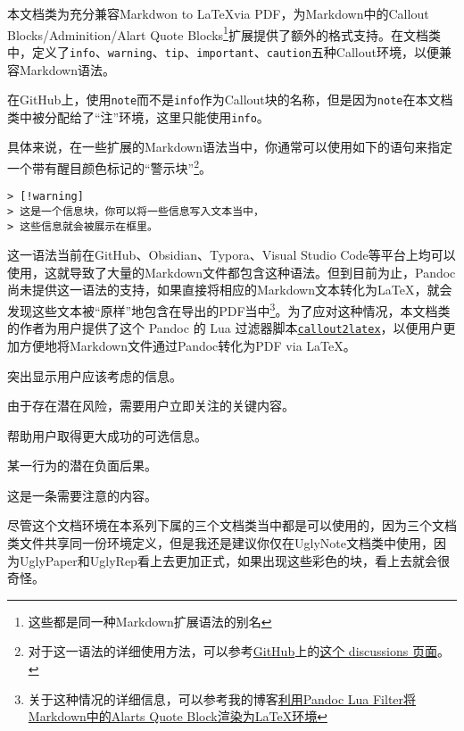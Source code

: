 本文档类为充分兼容Markdwon to \LaTeX via PDF，为Markdown中的Callout Blocks/Adminition/Alart Quote Blocks\footnote{这些都是同一种Markdown扩展语法的别名}扩展提供了额外的格式支持。在文档类中，定义了\texttt{info}、\texttt{warning}、\texttt{tip}、\texttt{important}、\texttt{caution}五种Callout环境，以便兼容Markdown语法。

\begin{note}
  在GitHub上，使用\texttt{note}而不是\texttt{info}作为Callout块的名称，但是因为\texttt{note}在本文档类中被分配给了“注”环境，这里只能使用\texttt{info}。
\end{note}

具体来说，在一些扩展的Markdown语法当中，你通常可以使用如下的语句来指定一个带有醒目颜色标记的“警示块”\footnote{对于这一语法的详细使用方法，可以参考\href{}{GitHub}上的\href{https://github.com/orgs/community/discussions/16925}{这个 discussions 页面}。}。

\begin{verbatim}
> [!warning]
> 这是一个信息块，你可以将一些信息写入文本当中，
> 这些信息就会被展示在框里。
\end{verbatim}

这一语法当前在GitHub、Obsidian、Typora、Visual Studio Code等平台上均可以使用，这就导致了大量的Markdown文件都包含这种语法。但到目前为止，Pandoc尚未提供这一语法的支持，如果直接将相应的Markdown文本转化为\LaTeX{}，就会发现这些文本被“原样”地包含在导出的PDF当中\footnote{关于这种情况的详细信息，可以参考我的博客\href{https://www.cnblogs.com/BOXonline1396529/articles/18799607}{利用Pandoc Lua Filter将Markdown中的Alarts Quote Block渲染为\LaTeX{}环境}}。为了应对这种情况，本文档类的作者为用户提供了这个 Pandoc 的 Lua 过滤器脚本\href{https://github.com/GitHubonline1396529/callout2latex}{\texttt{callout2latex}}，以便用户更加方便地将Markdown文件通过Pandoc转化为PDF via \LaTeX{}。

\begin{info}
  突出显示用户应该考虑的信息。
\end{info}

\begin{warning}
  由于存在潜在风险，需要用户立即关注的关键内容。
\end{warning}

\begin{tip}
  帮助用户取得更大成功的可选信息。
\end{tip}

\begin{important}
  某一行为的潜在负面后果。
\end{important}

\begin{caution}
  这是一条需要注意的内容。
\end{caution}

\begin{remark}
  尽管这个文档环境在本系列下属的三个文档类当中都是可以使用的，因为三个文档类文件共享同一份环境定义，但是我还是建议你仅在UglyNote文档类中使用，因为UglyPaper和UglyRep看上去更加正式，如果出现这些彩色的块，看上去就会很奇怪。
\end{remark}